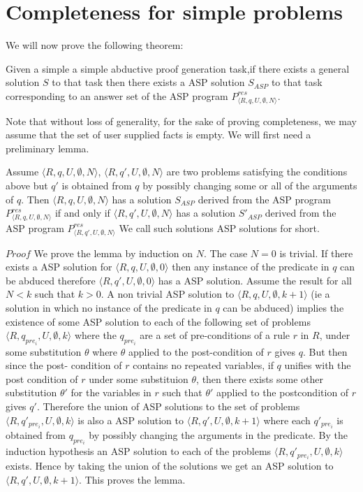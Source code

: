 \section{Completeness for simple  problems}\label{sec:completeness}
We will now prove the following theorem:
\begin{theorem}[Completeness]\label{thm:completeness}
  Given a simple a simple abductive proof generation task,if there exists a general solution $S$ to that task then there
  exists a ASP solution $S_{ASP}$ to that task corresponding to an answer set of the ASP program $P_{\langle R,q,U,\emptyset,N\rangle}^{res}$.
\end{theorem}
Note that without loss of generality, for the sake of proving completeness, we may assume that the set of user supplied facts is empty. We will first need a preliminary lemma.

\begin{lemma}
Assume $\langle R,q,U,\emptyset,N\rangle$, $\langle R,q',U,\emptyset,N\rangle$ are two
problems satisfying the conditions above but $q'$ is obtained from $q$ by
possibly changing some or all of the arguments of $q$. Then $\langle
R,q,U,\emptyset,N\rangle$ has a solution $S_{ASP}$ derived from the ASP program $P_{\langle R,q,U,\emptyset,N\rangle}^{res}$ if and only if $\langle R,q',U,\emptyset,N\rangle$ has a solution $S'_{ASP}$ derived from the ASP program $P_{\langle R,q',U,\emptyset,N\rangle}^{res}$ We call such solutions ASP solutions for short.
\end{lemma}

$Proof$ We prove the lemma by induction on $N$.
The case $N = 0$ is trivial. If there exists a ASP solution for $\langle
R,q,U,\emptyset,0\rangle$ then any instance of the predicate in $q$ can be
abduced therefore $\langle R,q',U,\emptyset,0\rangle$ has a ASP solution. Assume
the result for all $N<k$ such that $k>0$. A non trivial ASP solution to
$\langle R,q,U,\emptyset,k+1\rangle$ (ie a solution in which no instance of the predicate in $q$ can be abduced) implies the existence of some ASP solution to
each of the following set of problems $\langle R,q_{pre_{i}},U,\emptyset,k\rangle$
where the $q_{pre_{i}}$ are a set of
pre-conditions of a rule $r$ in $R$, under some substitution $\theta$ where
$\theta$ applied to the post-condition of $r$ gives $q$. But then since the post- condition of $r$
contains no repeated variables, if $q$ unifies with the post condition of $r$
under some substituion $\theta$, then there exists some other substitution
$\theta'$ for the variables in $r$ such that $\theta'$ applied to the
postcondition of $r$ gives $q'$. Therefore the union of ASP solutions to the set of problems
$\langle R,q'_{pre_{i}},U,\emptyset,k\rangle$ is also a ASP solution to $\langle
R,q',U,\emptyset,k+1\rangle$ where each $q'_{pre_{i}}$ is obtained from
$q_{pre_{i}}$ by possibly changing the arguments in the predicate. By the
induction hypothesis an ASP solution to each of the problems $\langle
R,q'_{pre_{i}},U,\emptyset,k\rangle$ exists. Hence by taking the union of the solutions we get an ASP solution to  $\langle
R,q',U,\emptyset,k+1\rangle$. This proves the lemma.

